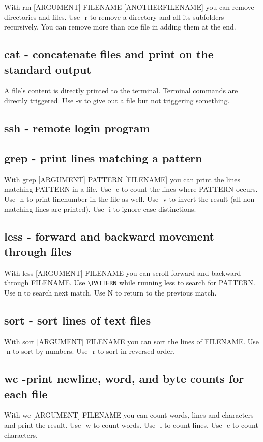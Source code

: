 \documentclass[10pt,a4paper]{scrartcl}
\begin{document}
With rm [ARGUMENT] FILENAME [ANOTHERFILENAME] you can remove directories and files. Use -r to remove a directory and all its subfolders recursively. You can remove more than one file in adding them at the end.

\subsection{cat - concatenate files and print on the standard output}

A file's content is directly printed to the terminal. Terminal commands are directly triggered. Use -v to give out a file but not triggering something.

\subsection{ssh - remote login program}

\subsection{grep - print lines matching a pattern}
With grep [ARGUMENT] PATTERN [FILENAME] you can print the lines matching PATTERN in a file. Use -c to count the lines where PATTERN occurs. Use -n to print linenumber in the file as well. Use -v to invert the result (all non-matching lines are printed). Use -i to ignore case distinctions.

\subsection{less - forward and backward movement through files}
With less [ARGUMENT] FILENAME you can scroll forward and backward through FILENAME. Use \verb$\PATTERN$ while running less to search for PATTERN. Use n to search next match. Use N to return to the previous match.

\subsection{sort - sort lines of text files}
With sort [ARGUMENT] FILENAME you can sort the lines of FILENAME. Use -n to sort by numbers. Use -r to sort in reversed order.

\subsection{wc -print newline, word, and byte counts for each file}
With wc [ARGUMENT] FILENAME you can count words, lines and characters and print the result. Use -w to count words. Use -l to count lines. Use -c to count characters.
\end{document}
